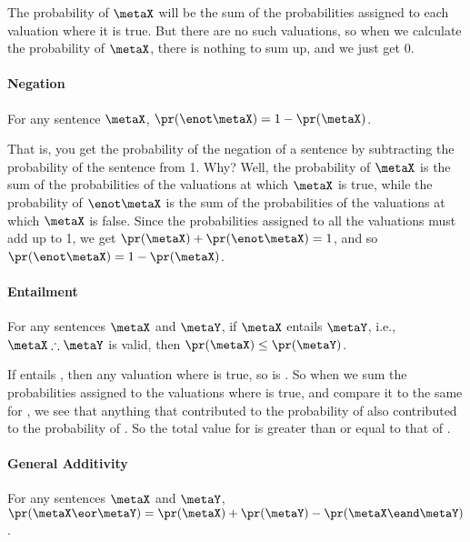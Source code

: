 The probability of $\metaX$ will be the sum of the probabilities assigned to each valuation where it is true. But there are no such valuations, so when we calculate the probability of $\metaX$, there is nothing to sum up, and we just get 0.

\paragraph{Negation}
 For any sentence $\metaX$, $\pr(\enot \metaX) = 1 - \pr(\metaX)$.

That is, you get the probability of the negation of a sentence by subtracting the probability of the sentence from 1. Why? Well, the probability of $\metaX$ is the sum of the probabilities of the valuations at which $\metaX$ is true, while the probability of $\enot \metaX$ is the sum of the probabilities of the valuations at which $\metaX$ is false. Since the probabilities assigned to all the valuations must add up to 1, we get $\pr(\metaX) + \pr(\enot \metaX) = 1$, and so $\pr(\enot \metaX) = 1 - \pr(\metaX)$.

\paragraph{Entailment} For any sentences $\metaX$ and $\metaY$, if $\metaX$ entails $\metaY$, i.e., $\metaX\therefore\metaY$ is valid, then $\pr(\metaX)\leq\pr(\metaY)$.

If \metaX entails \metaY, then any valuation where \metaX is true, so is \metaY. So when we sum the probabilities assigned to the valuations where \metaX is true, and compare it to the same for \metaY, we see that anything that contributed to the probability of \metaX also contributed to the probability of \metaY. So the total value for \metaY is greater than or equal to that of \metaX.

%

\paragraph{General Additivity} For any sentences $\metaX$ and $\metaY$, $\pr(\metaX \eor \metaY) = \pr(\metaX) + \pr(\metaY) - \pr(\metaX\eand \metaY)$.

